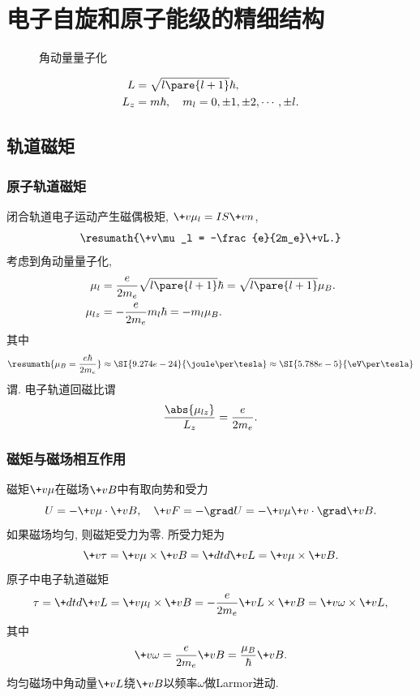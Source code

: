 \documentclass[hidelinks]{ctexart}
\begin{document}
\section{电子自旋和原子能级的精细结构} %
\label{sec:电子的自旋和原子能级的精细结构}

\begin{figure}[ht]
    \centering
    \caption{角动量量子化}
\end{figure}
\vspace{-\baselineskip}
\begin{align*}
    L &= \sqrt{l\pare{l+1}}\hbar, \\
    L_z &= m\hbar,\quad m_l = 0,\pm 1,\pm 2,\cdots,\pm l.
\end{align*}

\subsection{轨道磁矩} %
\label{sub:轨道磁矩}

\subsubsection{原子轨道磁矩} %
\label{ssub:原子轨道磁矩}

闭合轨道电子运动产生磁偶极矩, $\+v\mu_l = IS\+vn$,
\[ \resumath{\+v\mu_l = -\frac{e}{2m_e}\+vL.} \]
考虑到角动量量子化,
\begin{align*}
    \mu_l &= \frac{e}{2m_e}\sqrt{l\pare{l+1}}\hbar = \sqrt{l\pare{l+1}}\mu_B. \\
    \mu_{lz} &= -\frac{e}{2m_e}m_l\hbar = -m_l\mu_B.\\
\end{align*}
其中
\[ \resumath{\mu_B = \frac{e\hbar}{2m_e}} \approx \SI{9.274e-24}{\joule\per\tesla} \approx \SI{5.788e-5}{\eV\per\tesla} \]
谓. 电子轨道回磁比谓
\[ \frac{\abs{\mu_{lz}}}{L_z} = \frac{e}{2m_e}. \]


\subsubsection{磁矩与磁场相互作用} %
\label{ssub:磁矩与磁场相互作用}

磁矩$\+v\mu$在磁场$\+vB$中有取向势和受力
\[ U = -\+v\mu\cdot \+vB,\quad \+vF = -\grad U = -\+v\mu\+v\cdot\grad \+vB. \]
如果磁场均匀, 则磁矩受力为零. 所受力矩为
\[ \+v\tau = \+v\mu\times \+vB = \+dtd{\+vL} = \+v\mu\times \+vB. \]
原子中电子轨道磁矩
\[ \tau = \+dtd{\+vL} = \+v\mu_l\times \+vB = -\frac{e}{2m_e}\+vL\times \+vB = \+v\omega \times \+vL, \]
其中
\[ \+v\omega = \frac{e}{2m_e}\+vB = \frac{\mu_B}{\hbar}\+vB. \]
均匀磁场中角动量$\+vL$绕$\+vB$以频率$\omega$做Larmor进动.
\end{document}
